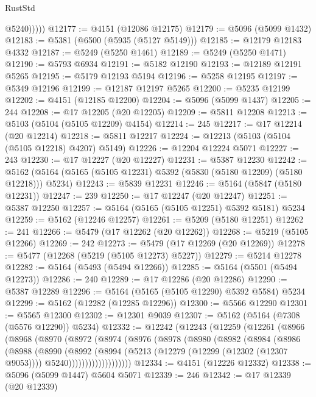 \begin{lexlean}{RustStd}
\begin{coremodule}
              @5240)))))
@12177 := @4151 (@12086 @12175)
@12179 := @5096 (@5099 @1432)
@12183 := @5381 (@6500 (@5935 (@5127 @5149)))
@12185 := @12179 @12183 @4332
@12187 := @5249 (@5250 @1461)
@12189 := @5249 (@5250 @1471)
@12190 := @5793 @6934
@12191 := @5182 @12190
@12193 := @12189 @12191 @5265
@12195 := @5179 @12193 @5194
@12196 := @5258 @12195
@12197 := @5349 @12196
@12199 := @12187 @12197 @5265
@12200 := @5235 @12199
@12202 := @4151 (@12185 @12200)
@12204 := @5096 (@5099 @1437)
@12205 := 244
@12208 := @17 @12205 (@20 @12205)
@12209 := @5811 @12208
@12213 := @5103 (@5104 (@5105 @12209) @4154)
@12214 := 245
@12217 := @17 @12214 (@20 @12214)
@12218 := @5811 @12217
@12224 := @12213 (@5103 (@5104 (@5105 @12218) @4207) @5149)
@12226 := @12204 @12224 @5071
@12227 := 243
@12230 := @17 @12227 (@20 @12227)
@12231 := @5387 @12230
@12242 := @5162 (@5164 (@5165 (@5105 @12231) @5392 (@5830 (@5180 @12209) (@5180 @12218))) @5234)
@12243 := @5839 @12231
@12246 := @5164 (@5847 (@5180 @12231))
@12247 := 239
@12250 := @17 @12247 (@20 @12247)
@12251 := @5387 @12250
@12257 := @5164 (@5165 (@5105 @12251) @5392 @5181) @5234
@12259 := @5162 (@12246 @12257)
@12261 := @5209 (@5180 @12251)
@12262 := 241
@12266 := @5479 (@17 @12262 (@20 @12262))
@12268 := @5219 (@5105 @12266)
@12269 := 242
@12273 := @5479 (@17 @12269 (@20 @12269))
@12278 := @5477 (@12268 (@5219 (@5105 @12273) @5227))
@12279 := @5214 @12278
@12282 := @5164 (@5493 (@5494 @12266))
@12285 := @5164 (@5501 (@5494 @12273))
@12286 := 240
@12289 := @17 @12286 (@20 @12286)
@12290 := @5387 @12289
@12296 := @5164 (@5165 (@5105 @12290) @5392 @5584) @5234
@12299 := @5162 (@12282 (@12285 @12296))
@12300 := @5566 @12290
@12301 := @5565 @12300
@12302 := @12301 @9039
@12307 := @5162 (@5164 (@7308 (@5576 @12290)) @5234)
@12332 := @12242
    (@12243
      (@12259
        (@12261
          (@8966
            (@8968
              (@8970
                (@8972
                  (@8974
                    (@8976
                      (@8978
                        (@8980
                          (@8982
                            (@8984
                              (@8986
                                (@8988
                                  (@8990
                                    (@8992
                                      (@8994
                                        (@5213
                                          (@12279 (@12299 (@12302 (@12307 @9053))))
                                          @5240)))))))))))))))))))
@12334 := @4151 (@12226 @12332)
@12338 := @5096 (@5099 @1447) @5604 @5071
@12339 := 246
@12342 := @17 @12339 (@20 @12339)

\end{coremodule}
\end{lexlean}
